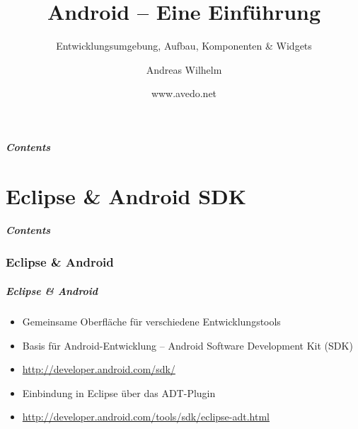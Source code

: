 \title{Android -- Eine Einführung}
\subtitle{Entwicklungsumgebung, Aufbau, Komponenten \& Widgets}
\author[A. Wilhelm]{Andreas Wilhelm}
\titlegraphic{}
\date{www.avedo.net}

\begin{frame}[plain]
  \titlepage
\end{frame}

\section[Contents]{}
\begin{frame}
	\frametitle{Contents}
	\tableofcontents[onlyparts]
\end{frame}

\part{Eclipse \& Android SDK}
\frame{\partpage}
\begin{frame}
	\frametitle{Contents}
	\tableofcontents[]
\end{frame}

\section{Eclipse \& Android}
\begin{frame}[label=eclipse_sdk]
   \frametitle{Eclipse \& Android}
   \begin{itemize}
      \item Gemeinsame Oberfläche für verschiedene Entwicklungstools
      \item Basis für Android-Entwicklung -- Android Software Development Kit (SDK)
      \item \href{http://developer.android.com/sdk/}{http://developer.android.com/sdk/}
      \item Einbindung in Eclipse über das ADT-Plugin
      \item \href{http://developer.android.com/tools/sdk/eclipse-adt.html}{http://developer.android.com/tools/sdk/eclipse-adt.html}
   \end{itemize}
\end{frame}

